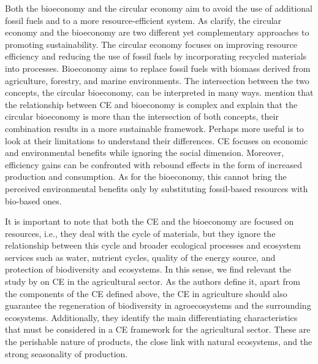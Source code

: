 Both the bioeconomy and the circular economy aim to avoid the use of additional fossil fuels and to a more resource-efficient system. As \cite{carus2018circular} clarify, the circular economy and the bioeconomy are two different yet complementary approaches to promoting sustainability. The circular economy focuses on improving resource efficiency and reducing the use of fossil fuels by incorporating recycled materials into processes. Bioeconomy aims to replace fossil fuels with biomass derived from agriculture, forestry, and marine environments. The intersection between the two concepts, the circular bioeconomy, can be interpreted in many ways. \cite{tan2021circular} mention that the relationship between CE and bioeconomy is complex and explain that the circular bioeconomy is more than the intersection of both concepts, their combination results in a more sustainable framework. Perhaps more useful is to look at their limitations to understand their differences. CE focuses on economic and environmental benefits while ignoring the social dimension. Moreover, efficiency gains can be confronted with rebound effects in the form of increased production and consumption. As for the bioeconomy, this cannot bring the perceived environmental benefits only by substituting fossil-based resources with bio-based ones.

It is important to note that both the CE and the bioeconomy are focused on resources, i.e., they deal with the cycle of materials, but they ignore the relationship between this cycle and broader ecological processes and ecosystem services such as water, nutrient cycles, quality of the energy source, and protection of biodiversity and ecosystems. In this sense, we find relevant the study by \cite{velasco2021circular} on CE in the agricultural sector. As the authors define it, apart from the components of the CE defined above, the CE in agriculture should also guarantee the regeneration of biodiversity in agroecosystems and the surrounding ecosystems. Additionally, they identify the main differentiating characteristics that must be considered in a CE framework for the agricultural sector. These are the perishable nature of products, the close link with natural ecosystems, and the strong seasonality of production. 


